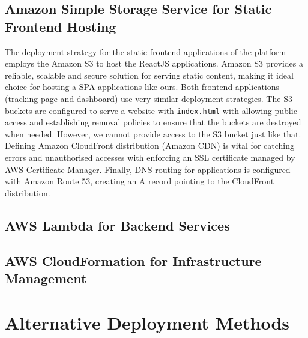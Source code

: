 \subsection{Amazon Simple Storage Service for Static Frontend Hosting}
\label{subsec:amazon-s3-static-frontend}
The deployment strategy for the static frontend applications of the platform employs the Amazon \ac{S3} to host the ReactJS applications. Amazon \ac{S3} provides a reliable, scalable and secure solution for serving static content, making it ideal choice for hosting a \ac{SPA} applications like ours.
Both frontend applications (tracking page and dashboard) use very similar deployment strategies.
The \ac{S3} buckets are configured to serve a website with \texttt{index.html} with allowing public access and establishing removal policies to ensure that the buckets are destroyed when needed. 
However, we cannot provide access to the S3 bucket just like that.
Defining Amazon CloudFront distribution (Amazon \ac{CDN}) is vital for catching errors and unauthorised accesses with enforcing an SSL certificate managed by \ac{AWS} Certificate Manager.
Finally, DNS routing for applications is configured with Amazon Route 53, creating an A record pointing to the CloudFront distribution.

\subsection{AWS Lambda for Backend Services}
\label{subsec:aws-lambda-backend}

\subsection{AWS CloudFormation for Infrastructure Management}
\label{subsec:aws-cloudformation-infrastructure}

\section{Alternative Deployment Methods}
\label{sec:alternative-deployment-methods}

